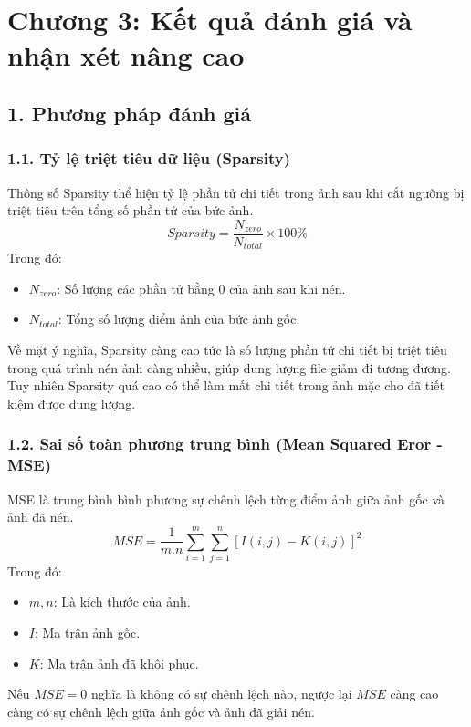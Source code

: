 \section*{Chương 3: Kết quả đánh giá và nhận xét nâng cao}

\subsection*{1. Phương pháp đánh giá}
\subsubsection*{1.1. Tỷ lệ triệt tiêu dữ liệu (Sparsity)}
\noindent Thông số Sparsity thể hiện tỷ lệ phần tử chi tiết trong ảnh sau khi cắt ngưỡng bị triệt tiêu trên tổng số phần tử của bức ảnh.
$$Sparsity = \frac{N_{zero}}{N_{total}} \times 100\%$$
Trong đó:
\begin{itemize}
    \item $N_{zero}$: Số lượng các phần tử bằng 0 của ảnh sau khi nén.
    \item $N_{total}$: Tổng số lượng điểm ảnh của bức ảnh gốc.
\end{itemize}
\noindent Về mặt ý nghĩa, Sparsity càng cao tức là số lượng phần tử chi tiết bị triệt tiêu trong quá trình nén ảnh càng nhiều,
giúp dung lượng file giảm đi tương đương. Tuy nhiên Sparsity quá cao có thể làm mất chi tiết trong ảnh mặc cho đã tiết kiệm được dung lượng.


\subsubsection*{1.2. Sai số toàn phương trung bình (Mean Squared Eror - MSE)}
\noindent MSE là trung bình bình phương sự chênh lệch từng điểm ảnh giữa ảnh gốc và ảnh đã nén.
$$MSE = \frac{1}{m.n} \sum_{i=1}^{m} \sum_{j=1}^{n} \left[ I(i,j)-K(i,j) \right]^2$$
Trong đó:
\begin{itemize}
    \item $m,n$: Là kích thước của ảnh.
    \item $I$: Ma trận ảnh gốc.
    \item $K$: Ma trận ảnh đã khôi phục.
\end{itemize}
\noindent Nếu $MSE=0$ nghĩa là không có sự chênh lệch nào, ngược lại $MSE$ càng cao càng có sự chênh lệch giữa ảnh gốc và ảnh đã giải nén.


